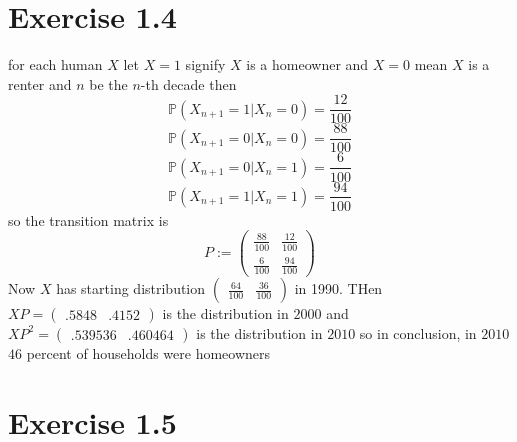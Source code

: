 \documentclass[11pt]{article}
\begin{document}
\section{Exercise 1.4}
for each human $X$ let $X =1$ signify  $X$ is a homeowner and  $X = 0$ mean  $X$ is a renter and $n$ be the $n$-th decade then
\[
    \mathbb{P}(X_{n+1} = 1| X_n = 0) = \frac{12}{100}
\] 
\[
    \mathbb{P}(X_{n+1} = 0 | X_n = 0) = \frac{88}{100}
\] 
\[
    \mathbb{P}(X_{n+1} = 0 | X_n = 1) = \frac{6}{100}
\] 
\[
    \mathbb{P}(X_{n+1} = 1 | X_n = 1) = \frac{94}{100}
\] 
so the transition matrix is
\[
P :=
\begin{pmatrix} 
    \frac{88}{100} & \frac{12}{100} \\
    \frac{6}{100} & \frac{94}{100}
\end{pmatrix} 
\] 
Now $X$ has starting distribution $\begin{pmatrix} \frac{64}{100} & \frac{36}{100} \end{pmatrix} $ in 1990.
THen $XP = \begin{pmatrix} .5848 & .4152 \end{pmatrix} $ is the distribution in $2000$
and $XP^2 = \begin{pmatrix} .539536 & .460464 \end{pmatrix} $ is the distribution in $2010$ so in conclusion, 
in $2010$  $46$ percent of households were homeowners

\section{Exercise 1.5}
\end{document}
